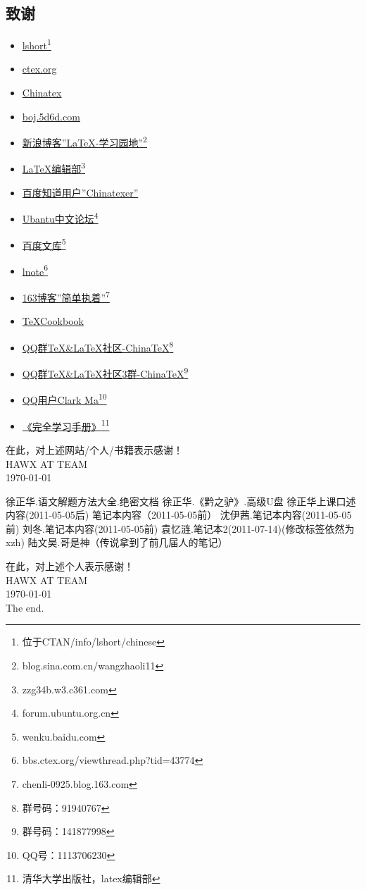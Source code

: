 \subsection{致谢}\label{thanks}
\begin{itemize}
\item \underline{lshort}\footnote{位于CTAN/info/lshort/chinese}
\item \underline{ctex.org}
\item \underline{Chinatex}
\item \underline{boj.5d6d.com}
\item \underline{新浪博客''LaTeX-学习园地''}\footnote{blog.sina.com.cn/wangzhaoli11}
\item \underline{LaTeX编辑部}\footnote{zzg34b.w3.c361.com}
\item \underline{百度知道用户''Chinatexer''}
\item \underline{Ubantu中文论坛}\footnote{forum.ubuntu.org.cn}
\item \underline{百度文库}\footnote{wenku.baidu.com}
\item \underline{lnote}\footnote{bbs.ctex.org/viewthread.php?tid=43774}
\item \underline{163博客''简单执着''}\footnote{chenli-0925.blog.163.com}
\item \underline{\TeX Cookbook}
\item \underline{QQ群TeX\&LaTeX社区-ChinaTeX}\footnote{群号码：91940767}
\item \underline{QQ群TeX\&LaTeX社区3群-ChinaTeX}\footnote{群号码：141877998}
\item \underline{QQ用户Clark Ma}\footnote{QQ号：1113706230}
\item \underline{《\LaTeXe 完全学习手册》}\footnote{清华大学出版社，latex编辑部}
\end{itemize}
在此，对上述网站/个人/书籍表示感谢！\\
HAWX AT TEAM\\
\today\\ %
\newpage
\begin{thebibliography}{99}
徐正华.语文解题方法大全.绝密文档
徐正华.《黔之驴》.高级U盘
徐正华上课口述内容(2011-05-05后)
笔记本内容（2011-05-05前）
沈伊茜.笔记本内容(2011-05-05前)
刘冬.笔记本内容(2011-05-05前)
袁忆涟.笔记本2(2011-07-14)(修改标签依然为xzh)
陆文昊.哥是神（传说拿到了前几届人的笔记）
\end{thebibliography}
在此，对上述个人表示感谢！\\
HAWX AT TEAM\\
\today\\
The end. \label{appendixinformal} 